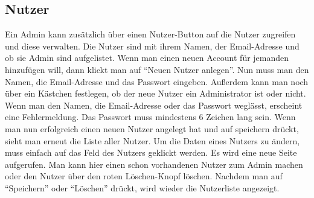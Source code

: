 \subsection{Nutzer}
Ein Admin kann zusätzlich über einen Nutzer-Button auf die Nutzer zugreifen und diese verwalten. Die Nutzer sind mit ihrem Namen, der Email-Adresse und ob sie Admin sind aufgelistet. Wenn man einen neuen Account für jemanden hinzufügen will, dann klickt man auf "`Neuen Nutzer anlegen"'. Nun muss man den Namen, die Email-Adresse und das Passwort eingeben. Außerdem kann man noch über ein Kästchen festlegen, ob der neue Nutzer ein Administrator ist oder nicht. Wenn man den Namen, die Email-Adresse oder das Passwort weglässt, erscheint eine Fehlermeldung. Das Passwort muss mindestens 6 Zeichen lang sein. Wenn man nun erfolgreich einen neuen Nutzer angelegt hat und auf speichern drückt, sieht man erneut die Liste aller Nutzer. Um die Daten eines Nutzers zu ändern, muss einfach auf das Feld des Nutzers geklickt werden. Es wird eine neue Seite aufgerufen. Man kann hier einen schon vorhandenen Nutzer zum Admin machen oder den Nutzer über den roten Löschen-Knopf löschen. Nachdem man auf "`Speichern"' oder "`Löschen"' drückt, wird wieder die Nutzerliste angezeigt. 